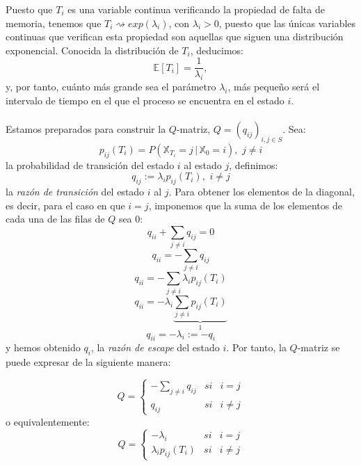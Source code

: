 \documentclass[12pt,a4paper]{article}
\begin{document}
Puesto que $T_i$ es una variable continua verificando la propiedad de falta de memoria, tenemos que $T_i\rightsquigarrow exp(\lambda_i)$, con $\lambda_i>0$, puesto que las únicas variables continuas que verifican esta propiedad son aquellas que siguen una distribución exponencial. Conocida la distribución de $T_i$, deducimos:
$$\mathbb{E}[T_i]=\dfrac{1}{\lambda_i},$$
y, por tanto, cuánto más grande sea el parámetro $\lambda_i$, más pequeño será el intervalo de tiempo en el que el proceso se encuentra en el estado $i$.
\\\\
Estamos preparados para construir la $Q$-matriz, $Q=(q_{ij})_{i,j\in S}$. Sea:
$$p_{ij}(T_i)=P(\mathbb{X}_{T_i}=j\, | \, \mathbb{X}_0=i), \,\, j\neq i$$
la probabilidad de transición del estado $i$ al estado $j$, definimos:
$$q_{ij}:=\lambda_i p_{ij}(T_i),\,\, i\neq j$$
la \textit{razón de transición} del estado $i$ al $j$. Para obtener los elementos de la diagonal, es decir, para el caso en que $i=j$, imponemos que la suma de los elementos de cada una de las filas de $Q$ sea $0$:
$$q_{ii}+\sum_{j\neq i}q_{ij}=0$$
$$q_{ii}=-\sum_{j\neq i}q_{ij}$$
$$q_{ii}=-\sum_{j\neq i}\lambda_i p_{ij}(T_i)$$
$$q_{ii}=-\lambda_i\underbrace{\sum_{j\neq i}p_{ij}(T_i)}_{1}$$
$$q_{ii}=-\lambda_i:=-q_i$$
y hemos obtenido $q_i$, la \textit{razón de escape} del estado $i$. Por tanto, la $Q$-matriz se puede expresar de la siguiente manera:

$$Q= \left\{ \begin{array}{lcc}
   	   	             -\sum\limits_{j\neq i}q_{ij} &   si  & i=j \\
   	   	             q_{ij} &  si & i\neq j
   	   	             \end{array} \right. $$
o equivalentemente:
$$Q= \left\{ \begin{array}{lcc}
   	   	             -\lambda_i &   si  & i=j \\
   	   	             \lambda_i p_{ij}(T_i) &  si & i\neq j
   	   	             \end{array} \right. $$
\end{document}
